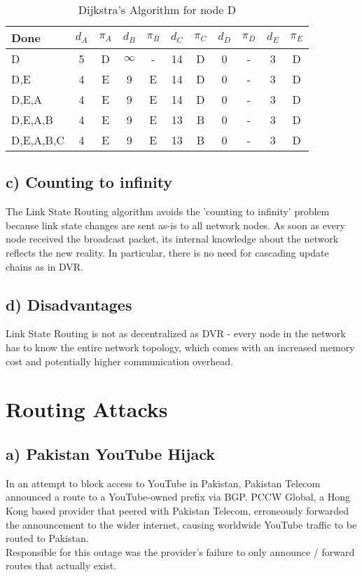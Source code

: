 \documentclass[a4paper, 11 pt, article, accentcolor=tud7b]{tudreport}
\begin{document}
	\begin{table}[h]
	  \centering
	  \begin{tabular}{| l | c | c | c | c | c | c | c | c | c | c |}
	    \hline
	    Done      & $d_A$ & $\pi_A$ & $d_B$ & $\pi_B$ & $d_C$ & $\pi_C$ & $d_D$ & $\pi_D$ & $d_E$ & $\pi_E$ \\ \hline
	    D         & 5     & D       & $\infty$& -     & 14    & D       & 0     & -       & 3     & D       \\ \hline
	    D,E       & 4     & E       & 9     & E       & 14    & D       & 0     & -       & 3     & D       \\ \hline
	    D,E,A     & 4     & E       & 9     & E       & 14    & D       & 0     & -       & 3     & D       \\ \hline
	    D,E,A,B   & 4     & E       & 9     & E       & 13    & B       & 0     & -       & 3     & D       \\ \hline
	    D,E,A,B,C & 4     & E       & 9     & E       & 13    & B       & 0     & -       & 3     & D       \\ \hline
	  \end{tabular}
	  \caption{Dijkstra's Algorithm for node D}
	\end{table}
	
	\subsection*{c) Counting to infinity}
	The Link State Routing algorithm avoids the 'counting to infinity' problem because link state changes are sent as-is to all network nodes. As soon as every node received the broadcast packet, its internal knowledge about the network reflects the new reality. In particular, there is no need for cascading update chains as in DVR.
	
	\subsection*{d) Disadvantages}
	Link State Routing is not as decentralized as DVR - every node in the network has to know the entire network topology, which comes with an increased memory cost and potentially higher communication overhead.
	
	\section{Routing Attacks}
	\subsection*{a) Pakistan YouTube Hijack}
	In an attempt to block access to YouTube in Pakistan, Pakistan Telecom announced a route to a YouTube-owned prefix via BGP. PCCW Global, a Hong Kong based provider that peered with Pakistan Telecom, erroneously forwarded the announcement to the wider internet, causing worldwide YouTube traffic to be routed to Pakistan. \\
	Responsible for this outage was the provider's failure to only announce / forward routes that actually exist.
	 
\end{document}
